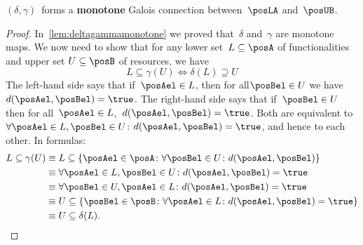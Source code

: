 \begin{lemma}
    $(\delta, \gamma)$~forms a \textbf{monotone} Galois connection between~$\posLA$ and~$\posUB$.
\end{lemma}
\begin{proof}
    In~\cref{lem:deltagammamonotone} we proved that~$\delta$ and~$\gamma$ are monotone maps.
    We now need to show that for any lower set~$L\subseteq \posA$ of functionalities and upper set $U\subseteq \posB$ of resources, we have
    \begin{equation}
        L\subseteq\gamma(U) \iff \delta(L)\supseteq U
    \end{equation}
    The left-hand side says that if~$\posAel\in L$, then for all$\posBel \in U$ we have $d(\posAel,\posBel)=\true$.
    The right-hand side says that if~$\posBel\in U$ then for all~$\posAel \in L$,~$d(\posAel,\posBel)=\true$.
    Both are equivalent to~$\forall \posAel\in L,\posBel\in U$: $d(\posAel,\posBel)=\true$, and hence to each other.
    In formulas:
    \begin{equation}
        \begin{aligned}
            L \subseteq \gamma(U)&\equiv L\subseteq \{\posAel \in \posA\colon \forall \posBel\in U\colon d(\posAel,\posBel)\} \\
            &\equiv \forall \posAel\in L, \posBel\in U \colon d(\posAel,\posBel)=\true \\
            &\equiv \forall \posBel\in U, \posAel\in L \colon d(\posAel,\posBel)=\true\\
            &\equiv U\subseteq \{\posBel\in \posB\colon \forall \posAel\in L\colon d(\posAel,\posBel)=\true \}\\
            &\equiv U\subseteq \delta(L).
        \end{aligned}
    \end{equation}
\end{proof}
